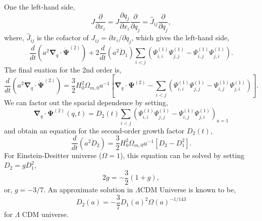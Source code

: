 \documentclass[a4paper]{article}
\begin{document}
One the left-hand side,
\begin{equation}
  J \frac{\partial}{\partial x_i} =
  J \frac{\partial q_j}{\partial x_i} \frac{\partial}{\partial q_j} =
  \hat{J}_{ij} \frac{\partial}{\partial q_j},
\end{equation}
where, $\hat{J}_{ij}$ is the cofactor of $J_{ij} = \partial x_i/\partial q_j$,
which gives the left-hand side,
\begin{equation}
  \frac{d}{dt} \left( a^2 \bm{\nabla}_q \cdot \dot{\bm{\Psi}}^{(2)} \right) +
  2 \frac{d}{dt} \left( a^2 \dot{D}_1 \right)
  \sum_{i<j} \left( \Psi_{i,i}^{(1)} \Psi_{j,j}^{(1)} -
      \Psi_{i,j}^{(1)} \Psi_{j,i}^{(1)}\right).
\end{equation}
The final euation for the 2nd order is,
\begin{equation}
  \frac{d}{dt} \left( a^2 \bm{\nabla}_q \cdot \dot{\bm{\Psi}}^{(2)} \right)
  = \frac{3}{2} H_0^2 \Omega_{m,0} a^{-1} \left[
    \bm{\nabla}_q \cdot \bm{\Psi}^{(2)} -
      \sum_{i<j} \left( \Psi_{i,i}^{(1)} \Psi_{j,j}^{(1)} -
      \Psi_{i,j}^{(1)} \Psi_{j,i}^{(1)}\right)
      \right].
\end{equation}
We can factor out the spacial dependence by setting,
\begin{equation}
  \bm{\nabla}_q \cdot \bm{\Psi}^{(2)}(q, t) =
  D_2(t) \sum_{i<j} \left( \Psi_{i,i}^{(1)} \Psi_{j,j}^{(1)} -
  \Psi_{i,j}^{(1)} \Psi_{j,i}^{(1)}\right)_{a=1}
\end{equation}
and obtain an equation for the second-order growth factor $D_2(t)$,
\begin{equation}
  \label{eq:second-growth-factor}
  \frac{d}{dt} \left( a^2 \dot{D}_2 \right)
    = \frac{3}{2} H_0^2 \Omega_{m,0} a^{-1} \left[  D_2 - D_1^2 \right].
\end{equation}
For Einstein-Desitter universe ($\Omega=1$), this equation can be solved by setting $D_2 = g D_1^2$,
\begin{equation}
  2g = -\frac{3}{2} (1 + g),
\end{equation}
or, $g = -3/7$. An approximate solution in $\Lambda$CDM Universe is
known to be,
\begin{equation}
  D_2(a) = -\frac{3}{7} D_1(a)^2 \Omega(a)^{-1/143}
\end{equation}
for $\Lambda$ CDM universe.  
\end{document}
